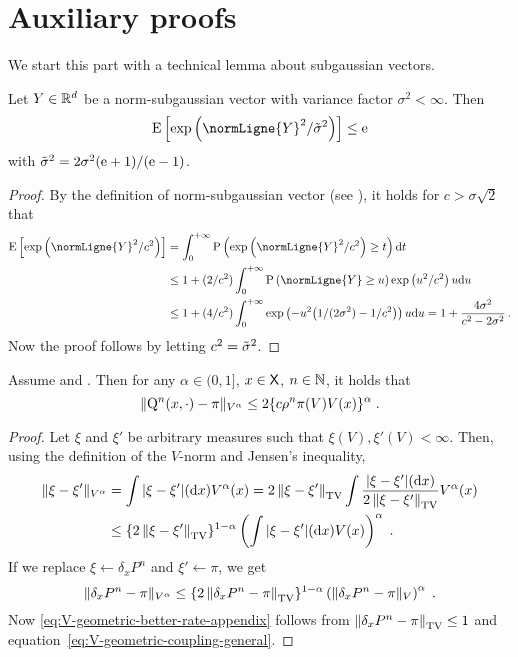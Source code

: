 \section{Auxiliary proofs}
We start this part with a technical lemma about subgaussian vectors.
\begin{lemma}
\label{subsec:proof:eq:bound_exp_sgd}
Let $Y \in \rset^d$ be a norm-subgaussian vector with variance factor $\sigma^2 < \infty$. Then
\[
\PE\left[\exp\parenthese{\normLigne{Y}^2/\sigmaconst^2}\right] \leq \rme
\]
with $\sigmaconst^2 = 2\sigma^2(\rme+1)/(\rme-1)$.
\end{lemma}
\begin{proof}
By the definition of norm-subgaussian vector (see ), it holds for $c > \sigma\sqrt{2}$ that
\begin{align*}
\PE\left[\exp\parenthese{\normLigne{Y}^2/c^2}\right]
&= \int_{0}^{+\infty}\PP\left(\exp\parenthese{\normLigne{Y}^2/c^2} \geq t\right)\rmd t \\
&\leq 1 + (2/c^2)\int_{0}^{+\infty}\PP\left(\normLigne{Y} \geq u\right)\exp\parenthese{u^2/c^2}u\rmd u \\
&\leq 1 + (4/c^2)\int_{0}^{+\infty}\exp\parenthese{-u^2\bigl(1/(2\sigma^2) - 1/c^2\bigr)}u\rmd u = 1 + \frac{4\sigma^2}{c^2-2\sigma^2}\,.
\end{align*}
Now the proof follows by letting $c^2 = \sigmaconst^2$.
\end{proof}
\begin{lemma}
\label{lem:rate_UGE}
Assume  and . Then for any $\alpha \in (0,1]$, $x \in \Xset$, $n \in \nset$, it holds that
\begin{equation}
\label{eq:V-geometric-better-rate-appendix}
\Vnorm[V^\alpha]{\MK^n(x, \cdot) - \pi}
 \leq 2 \{\cmconstv \ratev^n \pi(V)   V(x) \}^{\alpha}
\eqsp.
\end{equation}
\end{lemma}
\begin{proof}
Let $\xi$ and $\xi'$ be arbitrary measures such that $\xi(V), \xi'(V) < \infty$. Then, using the definition of the $V$-norm and Jensen's inequality,
\begin{align*}
\Vnorm[V^\alpha]{\xi - \xi'} &= \int |\xi - \xi'|(\rmd x) V^{\alpha}(x) = 2\tvnorm{\xi - \xi'} \int \frac{|\xi - \xi'|(\rmd x)}{2\tvnorm{\xi - \xi'}} V^\alpha(x) \\
&\leq \{ 2\tvnorm{\xi - \xi'} \}^{1-\alpha} \left( \int |\xi- \xi'|(\rmd x) V(x) \right)^\alpha \eqsp.
\end{align*}
If we replace $\xi \leftarrow \delta_x P^n$ and $\xi' \leftarrow \pi$, we get 
\begin{equation}
\Vnorm[V^\alpha]{\delta_x P^n - \pi} \leq 
\{ 2\tvnorm{\delta_x P^n - \pi} \}^{1-\alpha} \left( \Vnorm[V]{\delta_x P^n - \pi} \right)^\alpha\eqsp.
\end{equation}
Now \eqref{eq:V-geometric-better-rate-appendix} follows from $\tvnorm{\delta_x P^n - \pi} \leq 1$ and equation~\eqref{eq:V-geometric-coupling-general}.
\end{proof}
